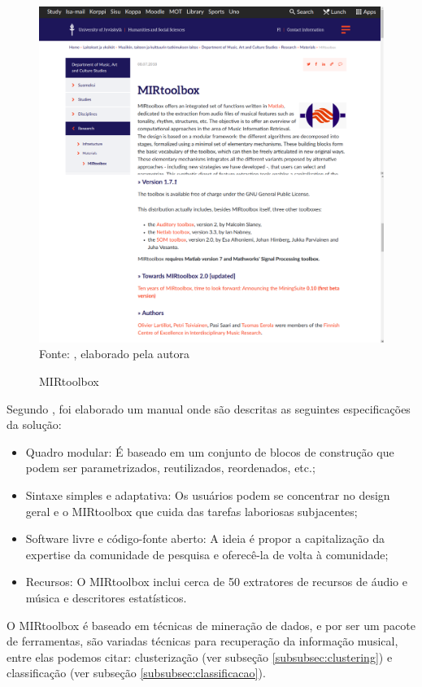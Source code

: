 \begin{figure}[!htb]
   \centering
   \caption{MIRtoolbox}\label{fig:mirtoolbox} 
   \includegraphics[scale=0.25]{figuras/mirtoolbox.png}
   \\Fonte: \cite{mirtoolbox}, elaborado pela autora
\end{figure}

Segundo , foi elaborado um manual onde são descritas as seguintes especificações da solução:

\begin{itemize}
    \item Quadro modular: É baseado em um conjunto de blocos de construção que podem ser parametrizados, reutilizados, reordenados, etc.;
    \item Sintaxe simples e adaptativa: Os usuários podem se concentrar no design geral e o MIRtoolbox que cuida das tarefas laboriosas subjacentes;
    \item Software livre e código-fonte aberto: A ideia é propor a capitalização da expertise da comunidade de pesquisa e oferecê-la de volta à comunidade;
    \item Recursos: O MIRtoolbox inclui cerca de 50 extratores de recursos de áudio e música e descritores estatísticos.
\end{itemize}

O MIRtoolbox é baseado em técnicas de mineração de dados, e por ser um pacote de ferramentas, são variadas técnicas para recuperação da informação musical, entre elas podemos citar: clusterização (ver subseção \ref{subsubsec:clustering}) e classificação (ver subseção \ref{subsubsec:classificacao}).

